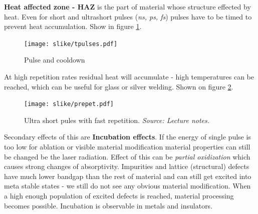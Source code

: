 
\textbf{Heat affected zone - HAZ} is the part of material whose structure effected by heat. Even for short and ultrashort 
pulses (\textit{ns, ps, fs}) pulses have to be timed to prevent heat accumulation. Show in figure \ref{fig:ptiming}.
\begin{figure}[h!]
    \centering
    \texttt{[image: slike/tpulses.pdf]}
    \caption{Pulse and cooldown}
    \label{fig:ptiming}
\end{figure}


At high repetition rates residual heat will accumulate - high temperatures can be reached, which can be useful for glass or silver welding.
Shown on figure \ref{fig:usprr}.

\begin{figure}[h!]
    \centering
    \texttt{[image: slike/prepet.pdf]}
    \caption{Ultra short pules with fast repetition. \textit{Source: Lecture notes.}}
    \label{fig:usprr}
\end{figure}

Secondary effects of this are \textbf{Incubation effects}.
If the energy of single pulse is too low for ablation or visible material modification material properties can still be changed be the laser radiation.
Effect of this can be \textit{partial oxidization} which causes strong changes of absorptivity. Impurities and lattice (structural) defects have much lower 
bandgap than the rest of material and can still get excited into meta stable states - we still do not see any obvious material modification.
When a high enough population of excited defects is reached, material processing becomes possible.
Incubation is observable in metals and insulators.


